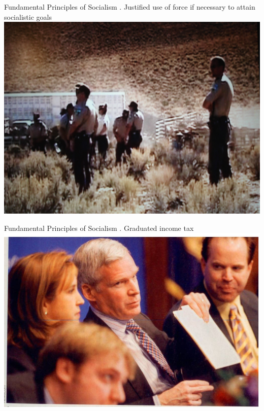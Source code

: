 \begin{frame}{Fundamental Principles of Socialism}
    . Justified use of force if necessary to attain socialistic goals
    \includegraphics[width=.9\textwidth]{img/justified-force.jpg} \\
\end{frame}

\begin{frame}{Fundamental Principles of Socialism}
    . Graduated income tax \\
    \includegraphics[width=.9\textwidth]{img/graduated-tax.jpg} \\
\end{frame}

